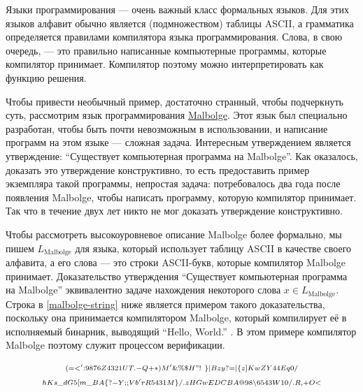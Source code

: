 \begin{example}Языки программирования — очень важный класс формальных языков. Для этих языков алфавит обычно является (подмножеством) таблицы ASCII, а грамматика определяется правилами компилятора языка программирования. Слова, в свою очередь, — это правильно написанные компьютерные программы, которые компилятор принимает. Компилятор поэтому можно интерпретировать как функцию решения.

Чтобы привести необычный пример, достаточно странный, чтобы подчеркнуть суть, рассмотрим язык программирования \href{https://en.wikipedia.org/wiki/Malbolge}{Malbolge}. Этот язык был специально разработан, чтобы быть почти невозможным в использовании, и написание программ на этом языке — сложная задача. Интересным утверждением является утверждение: ``Существует компьютерная программа на Malbolge''. Как оказалось, доказать это утверждение конструктивно, то есть предоставить пример экземпляра такой программы, непростая задача: потребовалось два года после появления Malbolge, чтобы написать программу, которую компилятор принимает. Так что в течение двух лет никто не мог доказать утверждение конструктивно.

Чтобы рассмотреть высокоуровневое описание Malbolge более формально, мы пишем $L_{\text{Malbolge}}$ для языка, который использует таблицу ASCII в качестве своего алфавита, а его слова — это строки ASCII-букв, которые компилятор Malbolge принимает. Доказательство утверждения ``Существует компьютерная программа на Malbolge'' эквивалентно задаче нахождения некоторого слова $x\in L_{\text{Malbolge}}$. Строка в \eqref{malbolge-string} ниже является примером такого доказательства, поскольку она принимается компилятором Malbolge, который компилирует её в исполняемый бинарник, выводящий ``Hello, World.'' . В этом примере компилятор Malbolge поэтому служит процессом верификации.

\begin{multline}\label{malbolge-string}
\scriptstyle (=<':9876Z4321UT.-Q+*)M'\&\%\$H"!~\}|Bzy?=|\{z]KwZY44Eq0/
\\ 
\scriptstyle hKs\_dG5[m\_BA\{?-Y;;Vb'rR5431M\}/.zHGwEDCBA@98\backslash 6543W10/.R,+O<
\end{multline}
\end{example}
